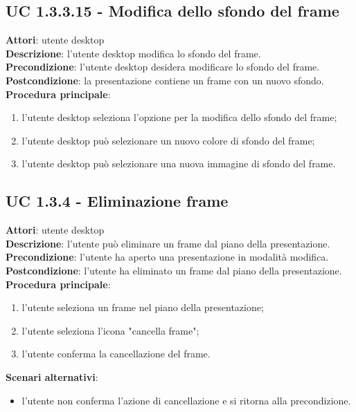 \subsection{UC 1.3.3.15 - Modifica dello sfondo del frame}{
	\label{uc1.3.3.15}
	\textbf{Attori}: utente desktop \\
	\textbf{Descrizione}: l'utente desktop modifica lo sfondo del frame. \\
	\textbf{Precondizione}: l'utente desktop desidera modificare lo sfondo del frame.	\\
	\textbf{Postcondizione}: la presentazione contiene un frame con un nuovo sfondo.	\\
	\textbf{Procedura principale}:
	\begin{enumerate}
		\item l'utente desktop seleziona l'opzione per la modifica dello sfondo del frame;
		\item l'utente desktop può selezionare un nuovo colore di sfondo del frame;
		\item l'utente desktop può selezionare una nuova immagine di sfondo del frame.
	\end{enumerate}
	}
\subsection{UC 1.3.4 - Eliminazione frame}{
	\label{uc1.3.4}
	\textbf{Attori}: utente desktop \\
	\textbf{Descrizione}: l'utente può eliminare un frame dal piano della presentazione. \\
	\textbf{Precondizione}: l'utente ha aperto una presentazione in modalità modifica.	\\
	\textbf{Postcondizione}: l'utente ha eliminato un frame dal piano della presentazione.	\\
	\textbf{Procedura principale}:
	\begin{enumerate}
		\item l'utente seleziona un frame nel piano della presentazione;
		\item l'utente seleziona l'icona "cancella frame";
		\item l'utente conferma la cancellazione del frame.
	\end{enumerate}
	\textbf{Scenari alternativi}: 
	\begin{itemize}
		\item l'utente non conferma l'azione di cancellazione e si ritorna alla precondizione.
	\end{itemize}
}
